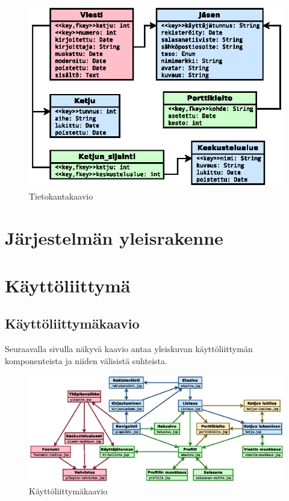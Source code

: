 \documentclass[11pt]{article}
\begin{document}
		\newpage
		\thispagestyle{plain}
		\begin{figure}[H]		
			\includegraphics[trim = 0mm 0mm 0mm 20mm, scale = 1.5]{uml-tietokantakaavio.eps}
			\caption{Tietokantakaavio}
		\end{figure}
		
\newpage
\thispagestyle{plain}
	\section{Järjestelmän yleisrakenne}
	
\newpage
\thispagestyle{plain}
	\section{Käyttöliittymä}
		\subsection{Käyttöliittymäkaavio} Seuraavalla sivulla näkyvä kaavio antaa yleiskuvan käyttöliittymän
		komponenteista ja niiden välisistä suhteista.
		
		\newpage
		\begin{figure}[H]		
			\includegraphics[trim = 0mm 0mm 23mm -7mm, scale = 1.5, angle = 90]{kayttoliittymakaavio.eps}
			\caption{Käyttöliittymäkaavio}
		\end{figure}

	
\end{document}
